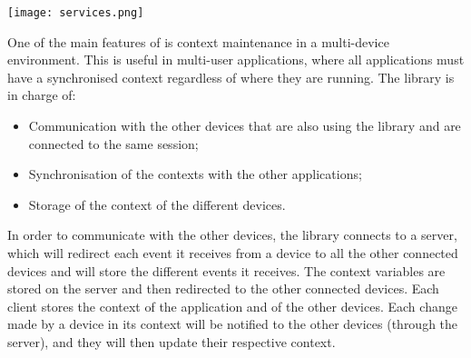 \begin{figure*}[htbp]
    \centering
    \texttt{[image: services.png]}
    \caption{\fontsize{10pt}{11pt}}
    \label{fig:orkservices}
\end{figure*}

One of the main features of \ork{} is context maintenance in a multi-device environment. This is useful in multi-user applications, where all applications must have a synchronised context regardless of where they are running. The \ork{} library is in charge of:
\begin{itemize}
    \item Communication with the other devices that are also using the library and are connected to the same session;
    \item Synchronisation of the contexts with the other applications;
    \item Storage of the context of the different devices.
\end{itemize} 

In order to communicate with the other devices, the library connects to a server, which will redirect each event it receives from a device to all the other connected devices and will store the different events it receives. The context variables are stored on the server and then redirected to the other connected devices. Each client stores the context of the application and of the other devices. Each change made by a device in its context will be notified to the other devices (through the server), and they will then update their respective context.

